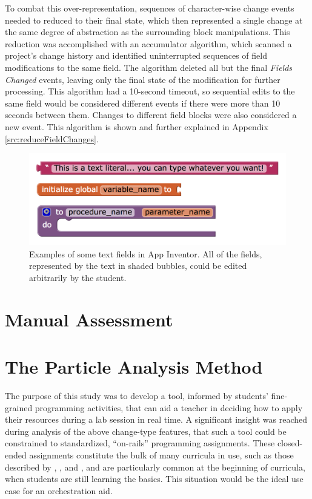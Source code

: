 To combat this over-representation, sequences of character-wise change events needed to reduced to their final state, which then represented a single change at the same degree of abstraction as the surrounding block manipulations. This reduction was accomplished with an accumulator algorithm, which scanned a project's change history and identified uninterrupted sequences of field modifications to the same field. The algorithm deleted all but the final \emph{Fields Changed} events, leaving only the final state of the modification for further processing. This algorithm had a 10-second timeout, so sequential edits to the same field would be considered different events if there were more than 10 seconds between them. Changes to different field blocks were also considered a new event. This algorithm is shown and further explained in Appendix \ref{src:reduceFieldChanges}.

\begin{figure}
  \centering
      \includegraphics[width=\textwidth]{images/ch4-text-fields}
  \caption[Examples of text fields in App Inventor]{Examples of some text fields in App Inventor. All of the fields, represented by the text in shaded bubbles, could be edited arbitrarily by the student.}
  \label{fig:text-fields}
\end{figure}


\section{Manual Assessment}



\section{The Particle Analysis Method}
\label{sec:particle-analysis}

The purpose of this study was to develop a tool, informed by students' fine-grained programming activities, that can aid a teacher in deciding how to apply their resources during a lab session in real time. A significant insight was reached during analysis of the above change-type features, that such a tool could be constrained to standardized, ``on-rails'' programming assignments. These closed-ended assignments constitute the bulk of many curricula in use, such as those described by  \citet{gray2012teaching}, \citet{martin2015dual}, and \citet{morelli2015analyzing}, and are particularly common at the beginning of curricula, when students are still learning the basics. This situation would be the ideal use case for an orchestration aid. 

